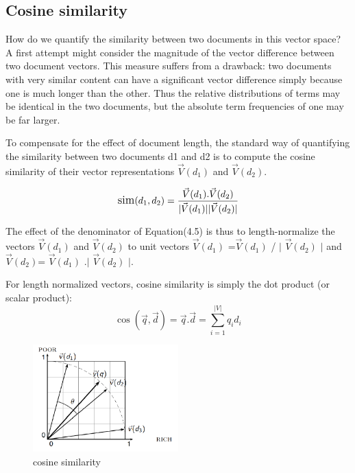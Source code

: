 \subsection{Cosine similarity}

How do we quantify the similarity between two documents in this vector
space? A first attempt might consider the magnitude of the vector difference
between two document vectors.
This measure suffers from a drawback: two documents with very similar content can have a significant vector difference simply because one is much longer than the other. Thus the relative distributions of terms may be identical in the two documents, but the absolute term frequencies of one may be far larger.

To compensate for the effect of document length, the standard way of
quantifying the similarity between two documents d1 and d2 is to compute the cosine similarity of their vector representations 
$\vec{V}(d_1)$ and $\vec{V}(d_2)$.

\begin{equation}
    \large
         \text{sim}(d_1 ,d_2) \\
         =\frac{\vec{V}( d_1 ) . \vec{V}( d_2 ) } {|\vec{V}( d_1 )| |\vec{V}( d_2 )|}
\end{equation}


The effect of the denominator of Equation(4.5) is thus to length-normalize the vectors $\vec{V}(d_1)$ and $\vec{V}(d_2)$ 
to unit vectors  $\vec{V}(d_1)$  =$\vec{V}(d_1)$  / $|$ $\vec{V}(d_2)$ $|$ and  $\vec{V}(d_2)$= $\vec{V}(d_1)$ .$|$ $\vec{V}(d_2)$ $|$. 

For length normalized vectors, cosine similarity is simply the dot product (or scalar product):
\begin{equation}
    \cos{(\vec{q},\vec{d})} = \vec{q} .\vec{d} =\sum_{i=1}^{|V|} q_{i}  d_{i}
\end{equation}
\begin{figure}[H]%
    \center%
    \includegraphics[width=0.5\textwidth]{images/shimaa/cosine similarity.png}
    \caption[Cosine similarity]{cosine similarity}\label{fig:cosine similarity}%
\end{figure}


